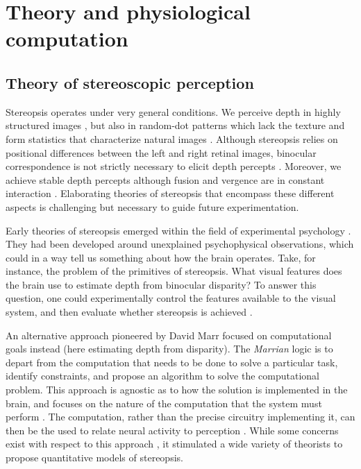 \section{Theory and physiological computation} 

\subsection{Theory of stereoscopic perception}


Stereopsis operates under very general conditions. We perceive depth in highly structured images \cite{Wheatstone:1838xf}, but also in random-dot patterns which lack the texture and form statistics that characterize natural images \cite{BLTJ:BLTJ3954}. Although stereopsis relies on positional differences between the left and right retinal images, binocular correspondence is not strictly necessary to elicit depth percepts \cite{KAUFMAN:1965vn,Mayhew:1976ys,Kaye:1978os,Nakayama:1990fc}. Moreover, we achieve stable depth percepts although fusion and vergence are in constant interaction \cite{Sperling:1970ys,Masson:1997jq}. Elaborating theories of stereopsis that encompass these different aspects is challenging but necessary to guide future experimentation.

Early theories of stereopsis emerged within the field of experimental psychology \cite{hering1977theory,koffka1935principles,Boring:1942bs,ogle1950researches,woodworth1954experimental}. They had been developed around unexplained psychophysical observations, which could in a way tell us something about how the brain operates. Take, for instance, the problem of the primitives of stereopsis. What visual features does the brain use to estimate depth from binocular disparity? To answer this question, one could experimentally control the features available to the visual system, and then evaluate whether stereopsis is achieved \cite{KAUFMAN:1965vn,KAUFMAN:1964kx,Mayhew:1976ys}.

An alternative approach pioneered by David Marr focused on computational goals instead (here estimating depth from disparity). The \textit{Marrian} logic is to depart from the computation that needs to be done to solve a particular task, identify constraints, and propose an algorithm to solve the computational problem. This approach is agnostic as to how the solution is implemented in the brain, and focuses on the nature of the computation that the system must perform \cite{Chomsky:1965kx,Marr:1976dq}. The computation, rather than the precise circuitry implementing it, can then be the used to relate neural activity to perception \cite{Carandini:2012ce}. While some concerns exist with respect to this approach \cite{Anderson:2015fu}, it stimulated a wide variety of theorists to propose quantitative models of stereopsis.

